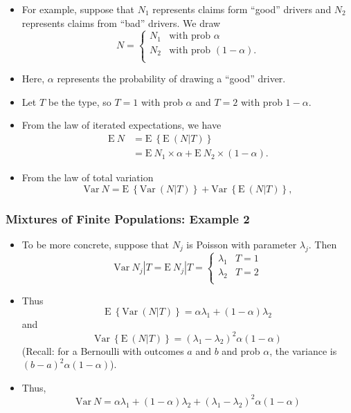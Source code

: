 \documentclass[]{book}
\begin{document}
\begin{itemize}
\item
  For example, suppose that \(N_1\) represents claims form ``good''
  drivers and \(N_2\) represents claims from ``bad'' drivers. We draw
  \[N =
  \begin{cases}
  N_1  &  \text{with prob~}\alpha\\
  N_2  &   \text{with prob~}(1-\alpha) .\\
  \end{cases}\]
\item
  Here, \(\alpha\) represents the probability of drawing a ``good''
  driver.
\item
  Let \(T\) be the type, so \(T=1\) with prob \(\alpha\) and \(T=2\)
  with prob \(1-\alpha\).
\item
  From the law of iterated expectations, we have \[\begin{aligned}
  \mathrm{E~} N &= \mathrm{E~} \left\{ \mathrm{E~} \left( N | T \right) \right \} \\
   &= \mathrm{E~} N_1 \times \alpha +  \mathrm{E~} N_2 \times (1-\alpha).\end{aligned}\]
\item
  From the law of total variation
  \[\mathrm{Var~} N= \mathrm{E~} \left\{ \mathrm{Var~} \left( N | T \right) \right \}
  +\mathrm{Var~} \left\{ \mathrm{E~} \left( N | T \right) \right \},\]
\end{itemize}

\subsubsection{Mixtures of Finite Populations: Example
2}\label{mixtures-of-finite-populations-example-2}

\begin{itemize}
\item
  To be more concrete, suppose that \(N_j\) is Poisson with parameter
  \(\lambda_j\). Then \[\mathrm{Var~} N_j|T= \mathrm{E~} N_j|T =
  \begin{cases}
  \lambda_1  &  T=1\\
  \lambda_2  &  T=2\\
  \end{cases}\]
\item
  Thus
  \[\mathrm{E~} \left\{ \mathrm{Var~} \left( N | T \right) \right \} = \alpha \lambda_1+ (1-\alpha) \lambda_2\]
  and
  \[\mathrm{Var~} \left\{ \mathrm{E~} \left( N | T \right) \right \} = (\lambda_1-\lambda_2)^2 \alpha (1-\alpha)\]
  (Recall: for a Bernoulli with outcomes \(a\) and \(b\) and prob
  \(\alpha\), the variance is \((b-a)^2\alpha(1-\alpha)\)).
\item
  Thus,
  \[\mathrm{Var~} N= \alpha \lambda_1+ (1-\alpha) \lambda_2 + (\lambda_1-\lambda_2)^2 \alpha (1-\alpha)\]
\end{itemize}
\end{document}
